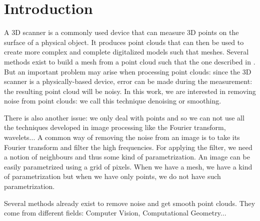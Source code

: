 

\chapter{Introduction}

A 3D scanner is a commonly used device that can measure 3D points on the surface
of a physical object.  It produces point clouds that can then be used to create
more complex and complete digitalized models such that meshes. Several methods
exist to build a mesh from a point cloud such that the one described in
\cite{alexa2003computing}. But an important problem may arise when processing
point clouds: since the 3D scanner is a physically-based device, error can be
made during the measurement: the resulting point cloud will be noisy. In this
work, we are interested in removing noise from point clouds: we call this
technique denoising or smoothing.

There is also another issue: we only deal with points and so we can not use all
the techniques developed in image processing like the Fourier transform,
wavelets... A common way of removing the noise from an image is to take its
Fourier transform and filter the high frequencies. For applying the filter, we
need a notion of neighbours and thus some kind of parametrization. An image can
be easily parametrized using a grid of pixels.  When we have a mesh, we have a
kind of parametrization but when we have only points, we do not have such
parametrization.

Several methods already exist to remove noise and get smooth point clouds.
They come from different fields: Computer Vision, Computational Geometry...

